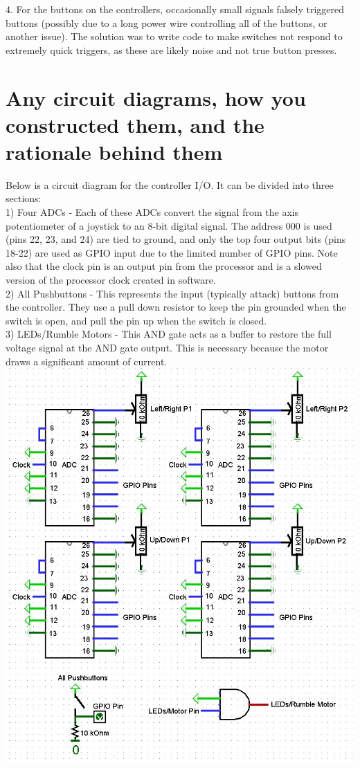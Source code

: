 \documentclass[12pt]{article} %
\begin{document}
4. For the buttons on the controllers, occasionally small signals falsely triggered buttons (possibly due to a long power wire controlling all of the buttons, or another issue). The solution was to write code to make switches not respond to extremely quick triggers, as these are likely noise and not true button presses.\\

\section{Any circuit diagrams, how you constructed them, and the rationale behind them}
Below is a circuit diagram for the controller I/O. It can be divided into three sections:\\
1) Four ADCs - Each of these ADCs convert the signal from the axis potentiometer of a joystick to an 8-bit digital signal. The address 000 is used (pins 22, 23, and 24) are tied to ground, and only the top four output bits (pins 18-22) are used as GPIO input due to the limited number of GPIO pins. Note also that the clock pin is an output pin from the processor and is a slowed version of the processor clock created in software.\\

2) All Pushbuttons - This represents the input (typically attack) buttons from the controller. They use a pull down resistor to keep the pin grounded when the switch is open, and pull the pin up when the switch is closed.\\

3) LEDs/Rumble Motors - This AND gate acts as a buffer to restore the full voltage signal at the AND gate output. This is necessary because the motor draws a significant amount of current.\\

\includegraphics[scale=0.75]{circuit}\\
\end{document}

